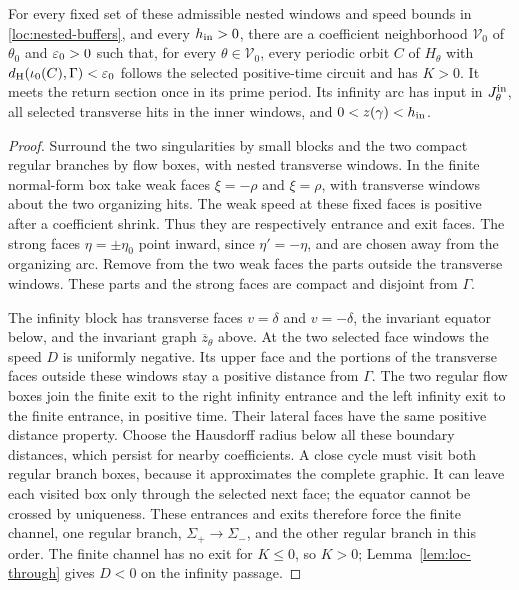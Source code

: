\begin{lemma}\label{lem:loc-capture}
For every fixed set of these admissible nested windows and speed bounds in
\eqref{loc:nested-buffers}, and every \(h_{\rm in}>0\), there
are a coefficient neighborhood \(\mathcal V_0\) of \(\theta_0\) and
\(\varepsilon_0>0\) such that, for every \(\theta\in\mathcal V_0\), every periodic
orbit \(C\) of \(H_\theta\) with
\(d_{\rm H}(\iota_0(C),\Gamma)<\varepsilon_0\) follows the selected
positive-time circuit and has \(K>0\).
It meets the return section once in its prime period.
Its infinity arc has input in \(J_\theta^{\rm in}\), all selected
transverse hits in the inner windows, and
\(0<z(\gamma)<h_{\rm in}\).
\end{lemma}
\begin{proof}
Surround the two singularities by small blocks and the two compact
regular branches by flow boxes, with nested transverse windows.
In the finite normal-form box take weak faces \(\xi=-\rho\) and
\(\xi=\rho\), with transverse windows about the two organizing hits.
The weak speed at these fixed faces is positive after a coefficient
shrink. Thus they are respectively entrance and exit faces. The strong
faces \(\eta=\pm\eta_0\) point inward, since \(\eta'=-\eta\),
and are chosen away from the organizing arc. Remove from the two weak
faces the parts outside the transverse windows. These parts and the
strong faces are compact and disjoint from \(\Gamma\).

The infinity block has transverse faces \(v=\delta\) and
\(v=-\delta\), the invariant equator below, and the invariant graph
\(\overline z_\theta\) above. At the two selected face windows the
speed \(D\) is uniformly negative. Its upper face and the portions
of the transverse faces outside these windows stay a positive distance
from \(\Gamma\). The two regular flow boxes join the finite exit to
the right infinity entrance and the left infinity exit to the finite
entrance, in positive time. Their lateral faces have the same positive
distance property. Choose the Hausdorff radius below all these boundary
distances, which persist for nearby coefficients. A close cycle must
visit both regular branch boxes, because it approximates the complete
graphic. It can leave each visited box only through the selected next
face; the equator cannot be crossed by uniqueness. These entrances and
exits therefore force the finite channel, one regular branch,
\(\Sigma_+\to\Sigma_-\), and the other regular branch in this order.
The finite channel has no exit for \(K\le0\), so \(K>0\);
Lemma~\ref{lem:loc-through} gives \(D<0\) on the infinity passage.


\end{proof}
